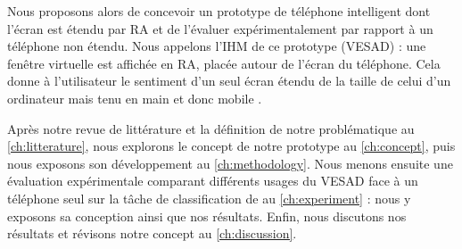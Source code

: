
Nous proposons alors de concevoir un prototype de téléphone intelligent dont l'écran est étendu par RA et de l'évaluer expérimentalement par rapport à un téléphone non étendu. Nous appelons l'IHM de ce prototype  (VESAD) : une fenêtre virtuelle est affichée en RA, placée autour de l'écran du téléphone. Cela donne à l'utilisateur le sentiment d'un seul écran étendu de la taille de celui d'un ordinateur mais tenu en main et donc mobile .

Après notre revue de littérature et la définition de notre problématique au \autoref{ch:litterature}, nous explorons le concept de notre prototype au \autoref{ch:concept}, puis nous exposons son développement au \autoref{ch:methodology}. Nous menons ensuite une évaluation expérimentale comparant différents usages du VESAD face à un téléphone seul sur la tâche de classification de \cite{Liu2014} au \autoref{ch:experiment} : nous y exposons sa conception ainsi que nos résultats. Enfin, nous discutons nos résultats et révisons notre concept au \autoref{ch:discussion}.